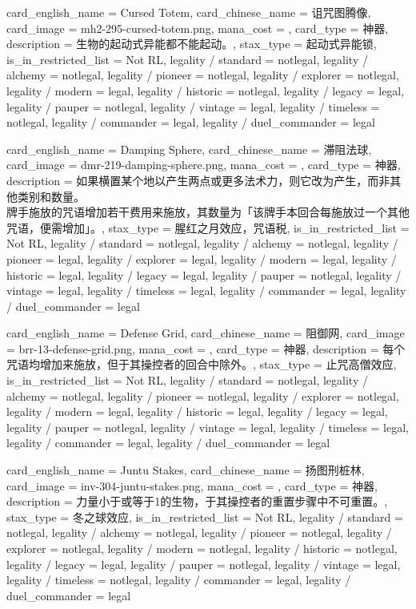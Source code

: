 \documentclass[lang = cn, color = black, 10pt]{AllThatStax}
\begin{document}
\card
{
	card_english_name = {Cursed Totem},
	card_chinese_name = {诅咒图腾像},
	card_image = mh2-295-cursed-totem.png,
	mana_cost = ,
	card_type = 神器,
	description = {生物的起动式异能都不能起动。},
	stax_type = 起动式异能锁,
	is_in_restricted_list = Not RL,
	legality / standard = notlegal,
	legality / alchemy = notlegal,
	legality / pioneer = notlegal,
	legality / explorer = notlegal,
	legality / modern = legal,
	legality / historic = notlegal,
	legality / legacy = legal,
	legality / pauper = notlegal,
	legality / vintage = legal,
	legality / timeless = notlegal,
	legality / commander = legal,
	legality / duel_commander = legal
}

\card
{
	card_english_name = {Damping Sphere},
	card_chinese_name = {滞阻法球},
	card_image = dmr-219-damping-sphere.png,
	mana_cost = ,
	card_type = 神器,
	description = {如果横置某个地以产生两点或更多法术力，则它改为产生，而非其他类别和数量。\\
牌手施放的咒语增加若干费用来施放，其数量为「该牌手本回合每施放过一个其他咒语，便需增加」。},
	stax_type = 腥红之月效应，咒语税,
	is_in_restricted_list = Not RL,
	legality / standard = notlegal,
	legality / alchemy = notlegal,
	legality / pioneer = legal,
	legality / explorer = legal,
	legality / modern = legal,
	legality / historic = legal,
	legality / legacy = legal,
	legality / pauper = notlegal,
	legality / vintage = legal,
	legality / timeless = legal,
	legality / commander = legal,
	legality / duel_commander = legal
}

\card
{
	card_english_name = {Defense Grid},
	card_chinese_name = {阻御网},
	card_image = brr-13-defense-grid.png,
	mana_cost = ,
	card_type = 神器,
	description = {每个咒语均增加来施放，但于其操控者的回合中除外。},
	stax_type = 止咒高僧效应,
	is_in_restricted_list = Not RL,
	legality / standard = notlegal,
	legality / alchemy = notlegal,
	legality / pioneer = notlegal,
	legality / explorer = notlegal,
	legality / modern = legal,
	legality / historic = legal,
	legality / legacy = legal,
	legality / pauper = notlegal,
	legality / vintage = legal,
	legality / timeless = legal,
	legality / commander = legal,
	legality / duel_commander = legal
}

\card
{
	card_english_name = {Juntu Stakes},
	card_chinese_name = {扬图刑桩林},
	card_image = inv-304-juntu-stakes.png,
	mana_cost = ,
	card_type = 神器,
	description = {力量小于或等于1的生物，于其操控者的重置步骤中不可重置。},
	stax_type = 冬之球效应,
	is_in_restricted_list = Not RL,
	legality / standard = notlegal,
	legality / alchemy = notlegal,
	legality / pioneer = notlegal,
	legality / explorer = notlegal,
	legality / modern = notlegal,
	legality / historic = notlegal,
	legality / legacy = legal,
	legality / pauper = notlegal,
	legality / vintage = legal,
	legality / timeless = notlegal,
	legality / commander = legal,
	legality / duel_commander = legal
}
\end{document}
